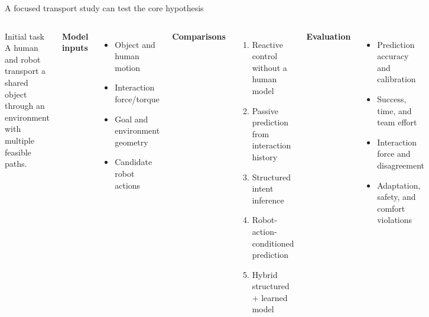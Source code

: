 \documentclass[aspectratio=169,11pt]{beamer}
\begin{document}
\begin{frame}[shrink=6]{A focused transport study can test the core hypothesis}
\begin{columns}[T,onlytextwidth]
\begin{block}{Initial task}
A human and robot transport a shared object through an environment with multiple feasible paths.
\end{block}
\textbf{Model inputs}
\begin{itemize}
  \item Object and human motion
  \item Interaction force/torque
  \item Goal and environment geometry
  \item Candidate robot actions
\end{itemize}
\textbf{Comparisons}
\begin{enumerate}
  \item Reactive control without a human model
  \item Passive prediction from interaction history
  \item Structured intent inference
  \item Robot-action-conditioned prediction
  \item Hybrid structured + learned model
\end{enumerate}
\textbf{Evaluation}
\begin{itemize}
  \item Prediction accuracy and calibration
  \item Success, time, and team effort
  \item Interaction force and disagreement
  \item Adaptation, safety, and comfort violations
\end{itemize}
\end{columns}
\end{frame}
\end{document}
